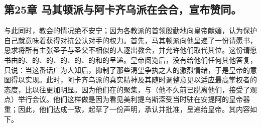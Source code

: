 
\subsection{第25章 马其顿派与阿卡齐乌派在会合，宣布赞同。}

与此同时，教会的情况绝不安宁；因为各教派的首领殷勤地向皇帝献媚，认为保护自己就意味着获得对抗公认对手的权力。首先，马其顿派向他呈递了一份请愿书，恳求将所有主张圣子与圣父不相似的人逐出教会，并允许他们取代其位。这份请愿书由的、的、的、的、的、的和的呈递。皇帝阅览后，没有给他们任何其他答复，只说：当这番话广为人知后，抑制了那些渴望争执之人的激烈情绪，于是皇帝的意图得以实现。此时，阿卡齐乌派的真实精神及其随时调整意见以适应最高掌权者的态度，比以往更加明显。因为他们在的聚集，与（他不久前已脱离他们，接受了观点）举行会议。他们这样做是因为看见美利提乌斯深受当时驻在安提阿的皇帝器重；因此，他们达成一致，起草了一份声明，承认并批准，呈递给皇帝。其内容如下。\par

\par

